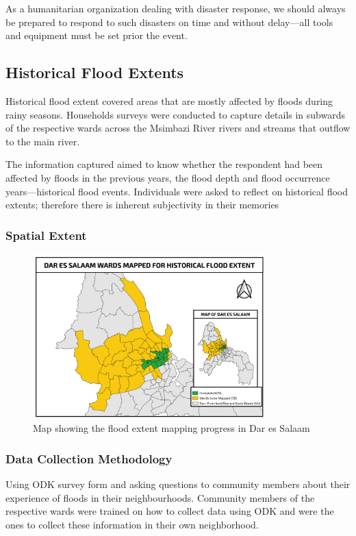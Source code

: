 \documentclass[a4paper,12pt,twoside]{article}
\begin{document}
As a humanitarian organization dealing with disaster response, we should always be prepared to respond to such disasters on time and without delay---all tools and equipment must be set prior the event.

\newpage
\subsection{Historical Flood Extents}

Historical flood extent covered areas that are mostly affected by floods during rainy seasons. Households surveys were conducted to capture details in  subwards of the respective wards across the Msimbazi River rivers and streams that outflow to the main river.

\medskip

The information captured aimed to know whether the respondent had been affected by floods in the previous years, the flood depth and flood occurrence years---historical flood events. Individuals were asked to reflect on historical flood extents; therefore there is inherent subjectivity in their memories

\subsubsection{Spatial Extent}
\begin{figure}[h]
  \color{RHgreen}\caption{Map showing the flood extent mapping progress in Dar es Salaam}
  \centering
  \includegraphics[width=0.8\textwidth]{Flood_Extent.png}
\end{figure}


\subsubsection{Data Collection Methodology}
Using ODK survey form and asking questions to community members about their experience of floods in their neighbourhoods. Community members of the respective wards were trained on how to collect data using ODK and were the ones to collect these information in their own neighborhood.
\end{document}
